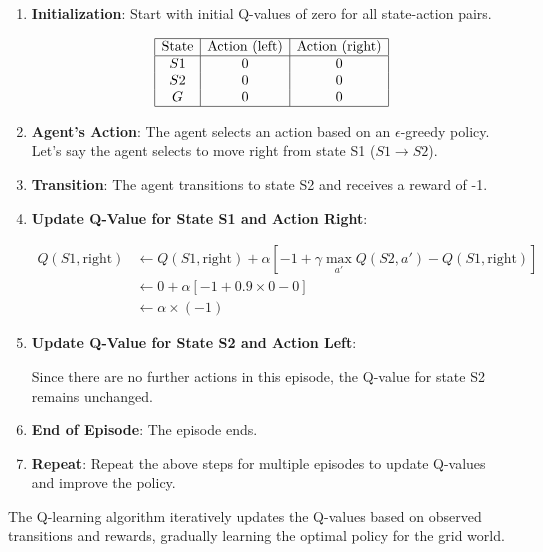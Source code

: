 \documentclass{article}
\begin{document}
\begin{enumerate}
    \item \textbf{Initialization}: Start with initial Q-values of zero for all state-action pairs.
    
    \[
    \begin{array}{|c|c|c|}
    \hline
    \text{State} & \text{Action (left)} & \text{Action (right)} \\
    \hline
    S1 & 0 & 0 \\
    S2 & 0 & 0 \\
    G & 0 & 0 \\
    \hline
    \end{array}
    \]
    
    \item \textbf{Agent's Action}: The agent selects an action based on an $ \epsilon $-greedy policy. Let's say the agent selects to move right from state S1 ($S1 \rightarrow S2$).
    
    \item \textbf{Transition}: The agent transitions to state S2 and receives a reward of -1.
    
    \item \textbf{Update Q-Value for State S1 and Action Right}:
    
    \[
    \begin{aligned}
    Q(S1, \text{right}) &\leftarrow Q(S1, \text{right}) + \alpha \left[ -1 + \gamma \max_{a'} Q(S2, a') - Q(S1, \text{right}) \right] \\
    &\leftarrow 0 + \alpha \left[ -1 + 0.9 \times 0 - 0 \right] \\
    &\leftarrow \alpha \times (-1)
    \end{aligned}
    \]
    
    \item \textbf{Update Q-Value for State S2 and Action Left}:
    
    Since there are no further actions in this episode, the Q-value for state S2 remains unchanged.
    
    \item \textbf{End of Episode}: The episode ends.
    
    \item \textbf{Repeat}: Repeat the above steps for multiple episodes to update Q-values and improve the policy.
\end{enumerate}

The Q-learning algorithm iteratively updates the Q-values based on observed transitions and rewards, gradually learning the optimal policy for the grid world.
\end{document}
